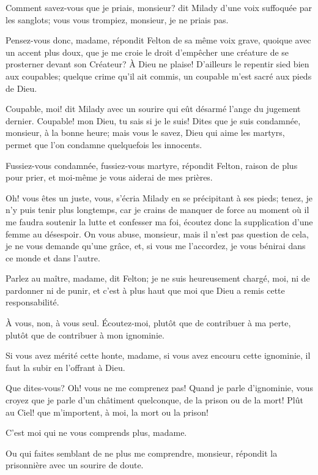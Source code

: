 \speak  Comment savez-vous que je priais, monsieur? dit Milady d'une voix suffoquée par les sanglots; vous vous trompiez, monsieur, je ne priais pas. 

\speak  Pensez-vous donc, madame, répondit Felton de sa même voix grave, quoique avec un accent plus doux, que je me croie le droit d'empêcher une créature de se prosterner devant son Créateur? À Dieu ne plaise! D'ailleurs le repentir sied bien aux coupables; quelque crime qu'il ait commis, un coupable m'est sacré aux pieds de Dieu. 

\speak  Coupable, moi! dit Milady avec un sourire qui eût désarmé l'ange du jugement dernier. Coupable! mon Dieu, tu sais si je le suis! Dites que je suis condamnée, monsieur, à la bonne heure; mais vous le savez, Dieu qui aime les martyrs, permet que l'on condamne quelquefois les innocents. 

\speak  Fussiez-vous condamnée, fussiez-vous martyre, répondit Felton, raison de plus pour prier, et moi-même je vous aiderai de mes prières. 

\speak  Oh! vous êtes un juste, vous, s'écria Milady en se précipitant à ses pieds; tenez, je n'y puis tenir plus longtemps, car je crains de manquer de force au moment où il me faudra soutenir la lutte et confesser ma foi, écoutez donc la supplication d'une femme au désespoir. On vous abuse, monsieur, mais il n'est pas question de cela, je ne vous demande qu'une grâce, et, si vous me l'accordez, je vous bénirai dans ce monde et dans l'autre. 

\speak  Parlez au maître, madame, dit Felton; je ne suis heureusement chargé, moi, ni de pardonner ni de punir, et c'est à plus haut que moi que Dieu a remis cette responsabilité. 

\speak  À vous, non, à vous seul. Écoutez-moi, plutôt que de contribuer à ma perte, plutôt que de contribuer à mon ignominie. 

\speak  Si vous avez mérité cette honte, madame, si vous avez encouru cette ignominie, il faut la subir en l'offrant à Dieu. 

\speak  Que dites-vous? Oh! vous ne me comprenez pas! Quand je parle d'ignominie, vous croyez que je parle d'un châtiment quelconque, de la prison ou de la mort! Plût au Ciel! que m'importent, à moi, la mort ou la prison! 

\speak  C'est moi qui ne vous comprends plus, madame. 

\speak  Ou qui faites semblant de ne plus me comprendre, monsieur, répondit la prisonnière avec un sourire de doute. 

